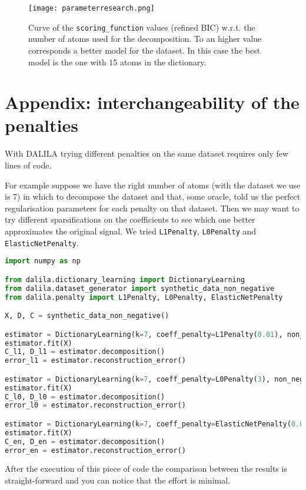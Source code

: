 %
%
\begin{figure}[H]
\centering
\texttt{[image: parameterresearch.png]}
\caption{Curve of the \texttt{scoring\_function} values (refined BIC) w.r.t. the number of atoms used for the decomposition. To an higher value corresponds a better model for the dataset. In this case the best model is the one with 15 atoms in the dictionary.}
\label{bic}
\end{figure}
%
%
%
%
%
\section{Appendix: interchangeability of the penalties} \label{penalty change}
With DALILA trying different penalties on the same dataset requires only few lines of code. 

For example suppose we have the right number of atoms (with the dataset we use is 7) in which to decompose the dataset and that, some oracle, told us the perfect regularisation parameters for each penalty on that dataset. Then we may want to try different sparsifications on the coefficients to see which one better approximates the original signal. We tried \texttt{L1Penalty}, \texttt{L0Penalty} and \texttt{ElasticNetPenalty}.

\begin{lstlisting}[language=Python]
import numpy as np

from dalila.dictionary_learning import DictionaryLearning
from dalila.dataset_generator import synthetic_data_non_negative
from dalila.penalty import L1Penalty, L0Penalty, ElasticNetPenalty

X, D, C = synthetic_data_non_negative()

estimator = DictionaryLearning(k=7, coeff_penalty=L1Penalty(0.01), non_negativity="both")
estimator.fit(X)
C_l1, D_l1 = estimator.decomposition()
error_l1 = estimator.reconstruction_error()

estimator = DictionaryLearning(k=7, coeff_penalty=L0Penalty(3), non_negativity="both")
estimator.fit(X)
C_l0, D_l0 = estimator.decomposition()
error_l0 = estimator.reconstruction_error()

estimator = DictionaryLearning(k=7, coeff_penalty=ElasticNetPenalty(0.01, 0.1, 0.7), non_negativity="both")
estimator.fit(X)
C_en, D_en = estimator.decomposition()
error_en = estimator.reconstruction_error()
\end{lstlisting}
After the execution of this piece of code the comparison between the results is straight-forward and you can notice that the effort is minimal. 

